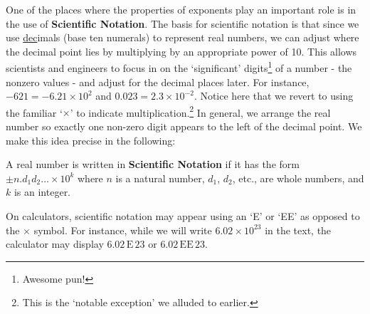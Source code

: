 \documentclass{ximera}
\begin{document}
One of the places where the properties of exponents play an important role is in the use of \textbf{Scientific Notation}.  The basis for scientific notation is that since we use \underline{dec}imals (base ten numerals) to represent real numbers, we can adjust where the decimal point lies by multiplying by an appropriate power of 10.  This allows scientists and engineers to focus in on the `significant' digits\footnote{Awesome pun!} of a number - the nonzero values - and adjust for the decimal places later.  For instance, $-621 = -6.21 \times 10^2$ and $0.023 = 2.3 \times 10^{-2}$.  Notice here that we revert to using the familiar `$\times$' to indicate multiplication.\footnote{This is the `notable exception' we alluded to earlier.}   In general, we arrange the real number so exactly one non-zero digit appears to the left of the decimal point.  We make this idea precise in the following: 

\medskip


\begin{definition} \label{scientificnotation}

A real number is written in \textbf{Scientific Notation} if it has the form $\pm n . d_{1} d_{2} \ldots \times 10^{k}$ where $n$ is a natural number, $d_{1}$, $d_{2}$, etc., are whole numbers, and $k$ is an integer.

\end{definition}


\medskip

On calculators, scientific notation may appear using an `E' or `EE' as opposed to the $\times$ symbol.  For instance, while we will write $6.02 \times 10^{23}$ in the text, the calculator may display $6.02\, \text{E} \, 23$ or $6.02\, \text{EE} \, 23$. 
\end{document}
